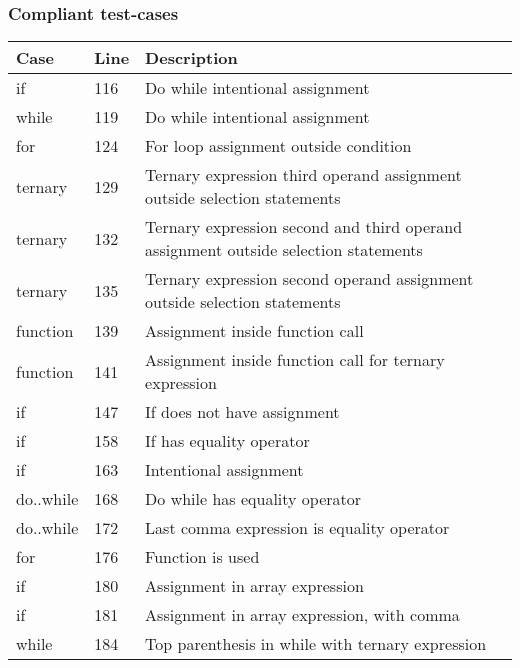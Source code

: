 \subsubsection{Compliant test-cases}

\begin{table}[H]
    \centering
    \begin{tabular}{|m{}|m{}|m{}|}
        \hline
        \textbf{Case} & \textbf{Line} & \textbf{Description}  \\

        \hline
        if  & 116  & Do while intentional assignment \\
        \hline
        while  & 119  & Do while intentional assignment \\
        \hline
        for  & 124  & For loop assignment outside condition \\
        \hline
        ternary  & 129  & Ternary expression third operand assignment outside selection statements  \\
        \hline
        ternary  & 132  & Ternary expression second and third operand assignment outside selection statements  \\
        \hline
        ternary  & 135  & Ternary expression second operand assignment outside selection statements  \\
        \hline
        function  & 139  & Assignment inside function call  \\
        \hline
        function  & 141  & Assignment inside function call for ternary expression  \\
        \hline
        if  & 147  & If does not have assignment \\
        \hline
        if  & 158  & If has equality operator \\ 
        \hline
        if  & 163 & Intentional assignment \\ 
        \hline 
        do..while  & 168 & Do while has equality operator \\ 
        \hline 
        do..while  & 172 & Last comma expression is equality operator \\ 
        \hline 
        for  & 176 & Function is used \\ 
        \hline 
        if  & 180 & Assignment in array expression \\ 
        \hline 
        if  & 181 & Assignment in array expression, with comma \\ 
        \hline 
        while  & 184 & Top parenthesis in while with ternary expression \\

\end{tabular}
\end{table}
